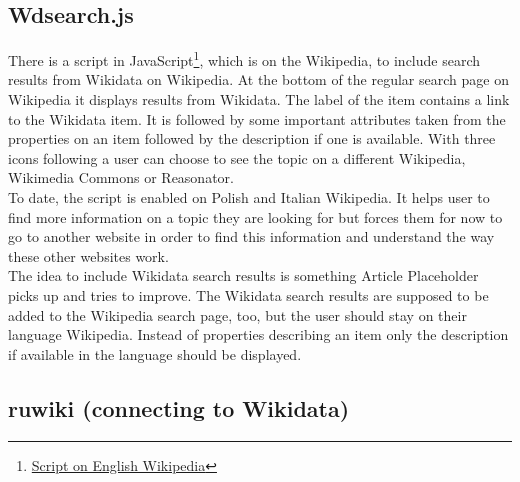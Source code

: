 \documentclass[11pt]{article}
\begin{document}
\subsection{Wdsearch.js}
There is a script in JavaScript\footnote{\href{https://en.wikipedia.org/w/index.php?title=MediaWiki:Wdsearch.js&action=raw&ctype=text/javascript}{Script on English Wikipedia}}, which is on the Wikipedia, to include search results from Wikidata on Wikipedia. At the bottom of the regular search page on Wikipedia it displays results from Wikidata. The label of the item contains a link to the Wikidata item. It is followed by some important attributes taken from the properties on an item followed by the description if one is available. With three icons following a user can choose to see the topic on a different Wikipedia, Wikimedia Commons or Reasonator. \\
To date, the script is enabled on Polish and Italian Wikipedia. It helps user to find more information on a topic they are looking for but forces them for now to go to another website in order to find this information and understand the way these other websites work. \\
The idea to include Wikidata search results is something Article Placeholder picks up and tries to improve. The Wikidata search results are supposed to be added to the Wikipedia search page, too, but the user should stay on their language Wikipedia. Instead of properties describing an item only the description if available in the language should be displayed. 

\subsection{ruwiki (connecting to Wikidata)}
\end{document}
